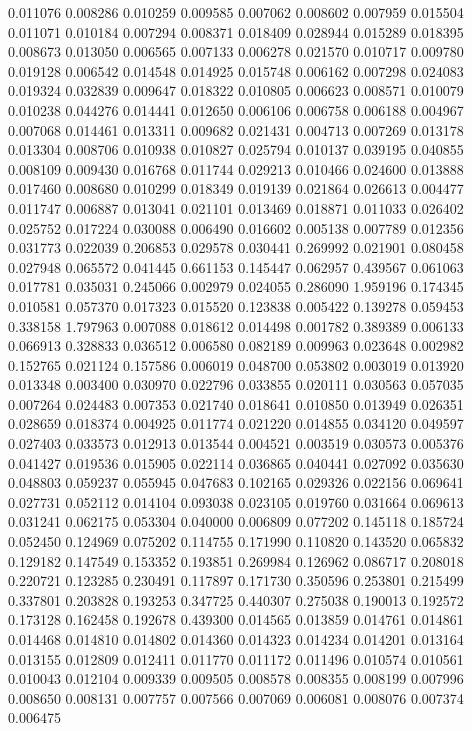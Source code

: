 0.011076
0.008286
0.010259
0.009585
0.007062
0.008602
0.007959
0.015504
0.011071
0.010184
0.007294
0.008371
0.018409
0.028944
0.015289
0.018395
0.008673
0.013050
0.006565
0.007133
0.006278
0.021570
0.010717
0.009780
0.019128
0.006542
0.014548
0.014925
0.015748
0.006162
0.007298
0.024083
0.019324
0.032839
0.009647
0.018322
0.010805
0.006623
0.008571
0.010079
0.010238
0.044276
0.014441
0.012650
0.006106
0.006758
0.006188
0.004967
0.007068
0.014461
0.013311
0.009682
0.021431
0.004713
0.007269
0.013178
0.013304
0.008706
0.010938
0.010827
0.025794
0.010137
0.039195
0.040855
0.008109
0.009430
0.016768
0.011744
0.029213
0.010466
0.024600
0.013888
0.017460
0.008680
0.010299
0.018349
0.019139
0.021864
0.026613
0.004477
0.011747
0.006887
0.013041
0.021101
0.013469
0.018871
0.011033
0.026402
0.025752
0.017224
0.030088
0.006490
0.016602
0.005138
0.007789
0.012356
0.031773
0.022039
0.206853
0.029578
0.030441
0.269992
0.021901
0.080458
0.027948
0.065572
0.041445
0.661153
0.145447
0.062957
0.439567
0.061063
0.017781
0.035031
0.245066
0.002979
0.024055
0.286090
1.959196
0.174345
0.010581
0.057370
0.017323
0.015520
0.123838
0.005422
0.139278
0.059453
0.338158
1.797963
0.007088
0.018612
0.014498
0.001782
0.389389
0.006133
0.066913
0.328833
0.036512
0.006580
0.082189
0.009963
0.023648
0.002982
0.152765
0.021124
0.157586
0.006019
0.048700
0.053802
0.003019
0.013920
0.013348
0.003400
0.030970
0.022796
0.033855
0.020111
0.030563
0.057035
0.007264
0.024483
0.007353
0.021740
0.018641
0.010850
0.013949
0.026351
0.028659
0.018374
0.004925
0.011774
0.021220
0.014855
0.034120
0.049597
0.027403
0.033573
0.012913
0.013544
0.004521
0.003519
0.030573
0.005376
0.041427
0.019536
0.015905
0.022114
0.036865
0.040441
0.027092
0.035630
0.048803
0.059237
0.055945
0.047683
0.102165
0.029326
0.022156
0.069641
0.027731
0.052112
0.014104
0.093038
0.023105
0.019760
0.031664
0.069613
0.031241
0.062175
0.053304
0.040000
0.006809
0.077202
0.145118
0.185724
0.052450
0.124969
0.075202
0.114755
0.171990
0.110820
0.143520
0.065832
0.129182
0.147549
0.153352
0.193851
0.269984
0.126962
0.086717
0.208018
0.220721
0.123285
0.230491
0.117897
0.171730
0.350596
0.253801
0.215499
0.337801
0.203828
0.193253
0.347725
0.440307
0.275038
0.190013
0.192572
0.173128
0.162458
0.192678
0.439300
0.014565
0.013859
0.014761
0.014861
0.014468
0.014810
0.014802
0.014360
0.014323
0.014234
0.014201
0.013164
0.013155
0.012809
0.012411
0.011770
0.011172
0.011496
0.010574
0.010561
0.010043
0.012104
0.009339
0.009505
0.008578
0.008355
0.008199
0.007996
0.008650
0.008131
0.007757
0.007566
0.007069
0.006081
0.008076
0.007374
0.006475
